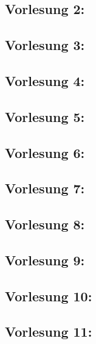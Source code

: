 \documentclass[10pt,a4paper]{article}
\begin{document}
\subsection*{Vorlesung 2:}
\label{v2}


\subsection*{Vorlesung 3:}
\label{v3}


\subsection*{Vorlesung 4:}
\label{v4}


\subsection*{Vorlesung 5:}
\label{v5}


\subsection*{Vorlesung 6:}
\label{v6}


\subsection*{Vorlesung 7:}
\label{v7}


\subsection*{Vorlesung 8:}
\label{v8}


\subsection*{Vorlesung 9:}
\label{v9}


\subsection*{Vorlesung 10:}
\label{v10}


\subsection*{Vorlesung 11:}
\label{v11}

\end{document}
